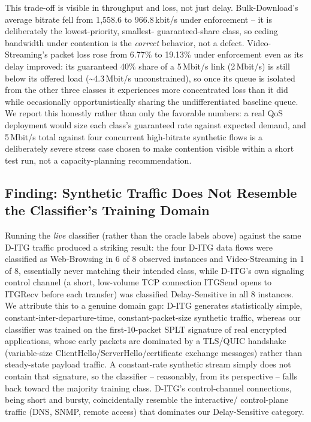 \documentclass[10pt,twocolumn]{article}
\begin{document}
This trade-off is visible in throughput and loss, not just delay.
Bulk-Download's average bitrate fell from 1{,}558.6 to 966.8\,kbit/s under
enforcement -- it is deliberately the lowest-priority, smallest-
guaranteed-share class, so ceding bandwidth under contention is the
\emph{correct} behavior, not a defect. Video-Streaming's packet loss rose
from 6.77\% to 19.13\% under enforcement even as its delay improved: its
guaranteed 40\% share of a 5\,Mbit/s link (2\,Mbit/s) is still below its
offered load (\textasciitilde4.3\,Mbit/s unconstrained), so once its
queue is isolated from the other three classes it experiences more
concentrated loss than it did while occasionally opportunistically
sharing the undifferentiated baseline queue. We report this honestly
rather than only the favorable numbers: a real QoS deployment would size
each class's guaranteed rate against expected demand, and 5\,Mbit/s total
against four concurrent high-bitrate synthetic flows is a deliberately
severe stress case chosen to make contention visible within a short test
run, not a capacity-planning recommendation.

\subsection{Finding: Synthetic Traffic Does Not Resemble the Classifier's Training Domain}

Running the \emph{live} classifier (rather than the oracle labels above)
against the same D-ITG traffic produced a striking result: the four
D-ITG data flows were classified as Web-Browsing in 6 of 8 observed
instances and Video-Streaming in 1 of 8, essentially never matching their
intended class, while D-ITG's own signaling control channel (a short,
low-volume TCP connection ITGSend opens to ITGRecv before each transfer)
was classified Delay-Sensitive in all 8 instances. We attribute this to a
genuine domain gap: D-ITG generates statistically simple,
constant-inter-departure-time, constant-packet-size synthetic traffic,
whereas our classifier was trained on the first-10-packet SPLT signature
of real encrypted applications, whose early packets are dominated by a
TLS/QUIC handshake (variable-size ClientHello/ServerHello/certificate
exchange messages) rather than steady-state payload traffic. A
constant-rate synthetic stream simply does not contain that signature,
so the classifier -- reasonably, from its perspective -- falls back
toward the majority training class. D-ITG's control-channel connections,
being short and bursty, coincidentally resemble the interactive/
control-plane traffic (DNS, SNMP, remote access) that dominates our
Delay-Sensitive category.
\end{document}
